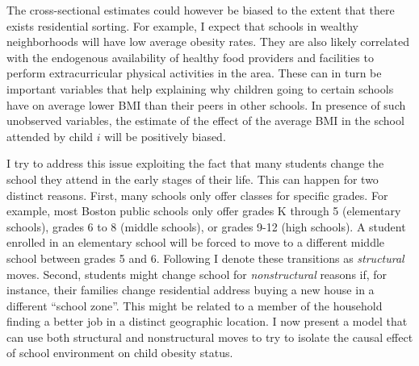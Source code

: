 \documentclass[twoside,12pt]{article}
\begin{document}
The cross-sectional estimates could however be biased to the extent that there exists residential sorting. For example, I expect that schools in wealthy neighborhoods will have low average obesity rates. They are also likely correlated with the endogenous availability of healthy food providers and facilities to perform extracurricular physical activities in the area. These can in turn be important variables that help explaining why children going to certain schools have on average lower BMI than their peers in other schools. In presence of such unobserved variables, the estimate of the effect of the average BMI in the school attended by child $i$ will be positively biased.

I try to address this issue exploiting the fact that many students change the school they attend in the early stages of their life. This can happen for two distinct reasons. First, many schools only offer classes for specific grades. For example, most Boston public schools only offer grades K through 5 (elementary schools), grades 6 to 8 (middle schools), or grades 9-12 (high schools). A student enrolled in an elementary school will be forced to move to a different middle school between grades 5 and 6. Following \cite{bradbury2013effect} I denote these transitions as \textit{structural} moves. Second, students might change school for \textit{nonstructural} reasons if, for instance, their families change residential address buying a new house in a different ``school zone''. This might be related to a member of the household finding a better job in a distinct geographic location. I now present a model that can use both structural and nonstructural moves to try to isolate the causal effect of school environment on child obesity status.
\end{document}
